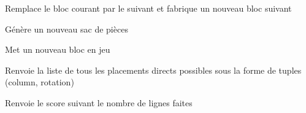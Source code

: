 \documentclass[letterpaper,10pt,french]{sphinxmanual}
\begin{document}
\begin{fulllineitems}
\begin{fulllineitems}
\end{fulllineitems}


\begin{fulllineitems}
\label{\detokenize{index:tetris_engine.TetrisEngine.generateNewBlock}}
Remplace le bloc courant par le suivant et fabrique un nouveau bloc suivant

\end{fulllineitems}


\begin{fulllineitems}
\label{\detokenize{index:tetris_engine.TetrisEngine.generateNewBlockBag}}
Génère un nouveau sac de pièces

\end{fulllineitems}


\begin{fulllineitems}
\label{\detokenize{index:tetris_engine.TetrisEngine.getNewBlock}}
Met un nouveau bloc en jeu

\end{fulllineitems}


\begin{fulllineitems}
\label{\detokenize{index:tetris_engine.TetrisEngine.getPossibleMovesDirect}}
Renvoie la liste de tous les placements directs possibles
sous la forme de tuples (column, rotation)

\end{fulllineitems}


\begin{fulllineitems}
\label{\detokenize{index:tetris_engine.TetrisEngine.getScoreFromLines}}
Renvoie le score suivant le nombre de lignes faites

\end{fulllineitems}


\end{fulllineitems}
\end{document}

